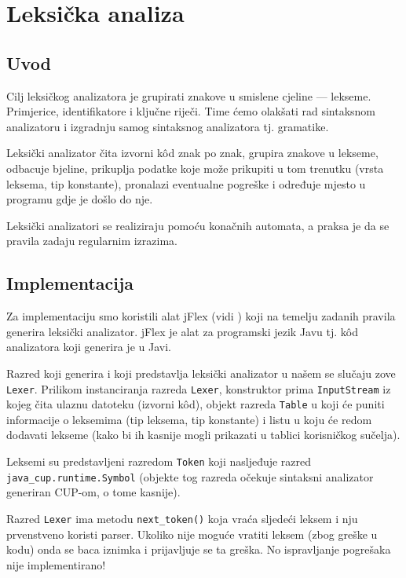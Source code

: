 \chapter{Leksička analiza}

\section{Uvod}
Cilj leksičkog analizatora je grupirati znakove u smislene cjeline --- lekseme. Primjerice, identifikatore i ključne riječi.
Time ćemo olakšati rad sintaksnom analizatoru i izgradnju samog sintaksnog analizatora tj. gramatike.

Leksički analizator čita izvorni kôd znak po znak, grupira znakove u lekseme, odbacuje bjeline, prikuplja podatke koje može prikupiti u tom trenutku (vrsta leksema, tip konstante), pronalazi eventualne pogreške i određuje mjesto u programu gdje je došlo do nje.

Leksički analizatori se realiziraju pomoću konačnih automata, a praksa je da se pravila zadaju regularnim izrazima.

\section{Implementacija}

Za implementaciju smo koristili alat jFlex (vidi \cite{jflex}) koji na temelju zadanih pravila generira leksički analizator. jFlex je
alat za programski jezik Javu tj. kôd analizatora koji generira je u Javi.

Razred koji generira i koji predstavlja leksički analizator u našem se slučaju zove \texttt{Lexer}. Prilikom
instanciranja razreda \texttt{Lexer}, konstruktor prima \texttt{InputStream} iz kojeg čita ulaznu datoteku (izvorni kôd),
objekt razreda \texttt{Table} u koji će puniti informacije o leksemima (tip leksema, tip konstante) i listu u koju će
redom dodavati lekseme (kako bi ih kasnije mogli prikazati u tablici korisničkog sučelja).

Leksemi su predstavljeni razredom \texttt{Token} koji nasljeđuje razred \texttt{java\_cup.runtime.Symbol} (objekte tog razreda
očekuje sintaksni analizator generiran CUP-om, o tome kasnije). 

Razred \texttt{Lexer} ima metodu \texttt{next\_token()} koja vraća sljedeći leksem i nju prvenstveno koristi parser. Ukoliko
nije moguće vratiti leksem (zbog greške u kodu) onda se baca iznimka i prijavljuje se ta greška. 
No ispravljanje pogrešaka nije implementirano!

